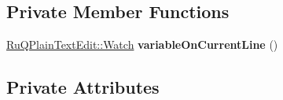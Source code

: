 \subsection*{Private Member Functions}
\begin{DoxyCompactItemize}
\item 
\hypertarget{class_ru_q_plain_text_edit_abbbaf9221ce9a2da5dc0465099080f01}{}\hyperlink{struct_ru_q_plain_text_edit_1_1_watch}{Ru\+Q\+Plain\+Text\+Edit\+::\+Watch} {\bfseries variable\+On\+Current\+Line} ()\label{class_ru_q_plain_text_edit_abbbaf9221ce9a2da5dc0465099080f01}

\end{DoxyCompactItemize}
\subsection*{Private Attributes}
